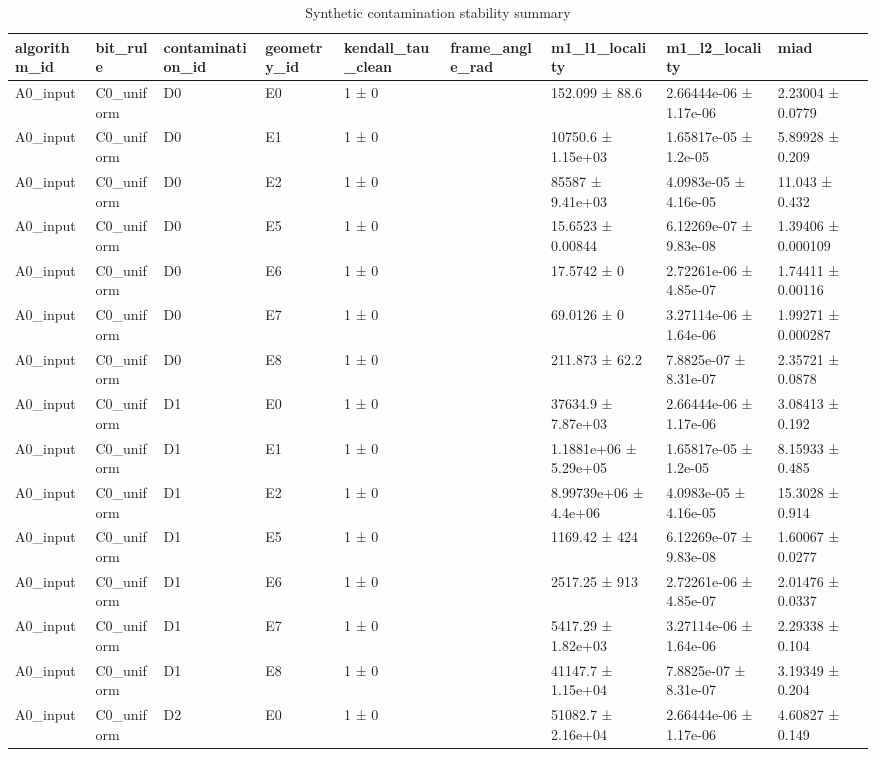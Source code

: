 \begin{table}
\caption{Synthetic contamination stability summary}
\label{tab:synthetic\_outlier}
\begin{tabular}{lllllllll}
\toprule
algorithm\_id & bit\_rule & contamination\_id & geometry\_id & kendall\_tau\_clean & frame\_angle\_rad & m1\_l1\_locality & m1\_l2\_locality & miad \\
\midrule
A0\_input & C0\_uniform & D0 & E0 & 1 ± 0 &  & 152.099 ± 88.6 & 2.66444e-06 ± 1.17e-06 & 2.23004 ± 0.0779 \\
A0\_input & C0\_uniform & D0 & E1 & 1 ± 0 &  & 10750.6 ± 1.15e+03 & 1.65817e-05 ± 1.2e-05 & 5.89928 ± 0.209 \\
A0\_input & C0\_uniform & D0 & E2 & 1 ± 0 &  & 85587 ± 9.41e+03 & 4.0983e-05 ± 4.16e-05 & 11.043 ± 0.432 \\
A0\_input & C0\_uniform & D0 & E5 & 1 ± 0 &  & 15.6523 ± 0.00844 & 6.12269e-07 ± 9.83e-08 & 1.39406 ± 0.000109 \\
A0\_input & C0\_uniform & D0 & E6 & 1 ± 0 &  & 17.5742 ± 0 & 2.72261e-06 ± 4.85e-07 & 1.74411 ± 0.00116 \\
A0\_input & C0\_uniform & D0 & E7 & 1 ± 0 &  & 69.0126 ± 0 & 3.27114e-06 ± 1.64e-06 & 1.99271 ± 0.000287 \\
A0\_input & C0\_uniform & D0 & E8 & 1 ± 0 &  & 211.873 ± 62.2 & 7.8825e-07 ± 8.31e-07 & 2.35721 ± 0.0878 \\
A0\_input & C0\_uniform & D1 & E0 & 1 ± 0 &  & 37634.9 ± 7.87e+03 & 2.66444e-06 ± 1.17e-06 & 3.08413 ± 0.192 \\
A0\_input & C0\_uniform & D1 & E1 & 1 ± 0 &  & 1.1881e+06 ± 5.29e+05 & 1.65817e-05 ± 1.2e-05 & 8.15933 ± 0.485 \\
A0\_input & C0\_uniform & D1 & E2 & 1 ± 0 &  & 8.99739e+06 ± 4.4e+06 & 4.0983e-05 ± 4.16e-05 & 15.3028 ± 0.914 \\
A0\_input & C0\_uniform & D1 & E5 & 1 ± 0 &  & 1169.42 ± 424 & 6.12269e-07 ± 9.83e-08 & 1.60067 ± 0.0277 \\
A0\_input & C0\_uniform & D1 & E6 & 1 ± 0 &  & 2517.25 ± 913 & 2.72261e-06 ± 4.85e-07 & 2.01476 ± 0.0337 \\
A0\_input & C0\_uniform & D1 & E7 & 1 ± 0 &  & 5417.29 ± 1.82e+03 & 3.27114e-06 ± 1.64e-06 & 2.29338 ± 0.104 \\
A0\_input & C0\_uniform & D1 & E8 & 1 ± 0 &  & 41147.7 ± 1.15e+04 & 7.8825e-07 ± 8.31e-07 & 3.19349 ± 0.204 \\
A0\_input & C0\_uniform & D2 & E0 & 1 ± 0 &  & 51082.7 ± 2.16e+04 & 2.66444e-06 ± 1.17e-06 & 4.60827 ± 0.149 \\

\end{tabular}
\end{table}
